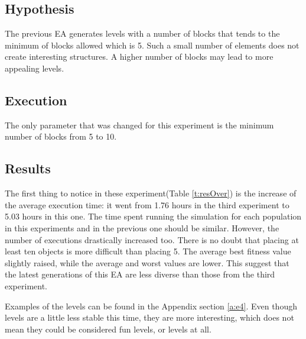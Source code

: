 \subsection{Hypothesis}
The previous \acs{EA} generates levels with a number of blocks that tends to the minimum of blocks allowed which is 5. Such a small number of elements does not create interesting structures. A higher number of blocks may lead to more appealing levels.
\subsection{Execution}
The only parameter that was changed for this experiment is the minimum number of blocks from 5 to 10. 
\subsection{Results}
The first thing to notice in these experiment(Table \ref{t:resOver}) is the increase of the average execution time: it went from 1.76 hours in the third experiment to 5.03 hours in this one. The time spent running the simulation for each population in this experiments and in the previous one should be similar. However, the number of executions drastically increased too. There is no doubt that placing at least ten objects is more difficult than placing 5. The average best fitness value slightly raised, while the average and worst values are lower. This suggest that the latest generations of this \acs{EA} are less diverse than those from the third experiment. 

Examples of the levels can be found in the Appendix section \ref{a:e4}. Even though levels are a little less stable this time, they are more interesting, which does not mean they could be considered fun levels, or levels at all.

